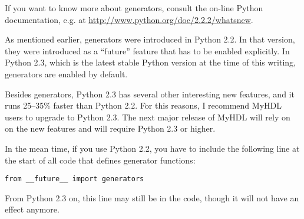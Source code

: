 If you want to know more about generators, consult the on-line Python
documentation, e.g. at \url{http://www.python.org/doc/2.2.2/whatsnew}. 

\begin{notice}[warning]
As mentioned earlier, generators were introduced in Python 2.2. In
that version, they were introduced as a ``future'' feature that has to
be enabled explicitly. In Python 2.3, which is the latest stable
Python version at the time of this writing, generators are enabled by
default.

Besides generators, Python 2.3 has several other interesting new
features, and it runs 25--35\% faster than Python 2.2. For this
reasons, I recommend MyHDL users to upgrade to Python 2.3. The next
major release of MyHDL will rely on on the new features and will
require Python 2.3 or higher.

In the mean time, if you use Python 2.2, you have to include the
following line at the start of all code that defines generator
functions:

\begin{verbatim}
from __future__ import generators
\end{verbatim}

From Python 2.3 on, this line may still be in the code, though it will
not have an effect anymore.
\end{notice}


